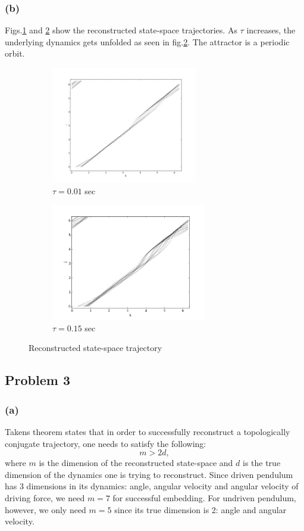 \documentclass{article}
\begin{document}
\subsubsection*{(b)}
Figs.\ref{q2b_1} and \ref{q2b_2} show the reconstructed state-space trajectories. As $\tau$ increases, the underlying dynamics gets unfolded as seen in fig.\ref{q2b_2}. The attractor is a periodic orbit.

\begin{figure}
\centering
\begin{subfigure}{.5\textwidth}
  \centering
  \includegraphics[height=2in]{figs/q2b_10.png}
  \caption{$\tau = 0.01$ sec}
  \label{q2b_1}
\end{subfigure}%
\begin{subfigure}{.5\textwidth}
  \centering
  \includegraphics[height=2in]{figs/q2b_150.png}
  \caption{$\tau = 0.15$ sec}
  \label{q2b_2}
\end{subfigure}
\caption{Reconstructed state-space trajectory}
\label{q2b}
\end{figure}

\subsection*{Problem 3}
\subsubsection*{(a)}
Takens theorem states that in order to successfully reconstruct a topologically conjugate trajectory, one needs to satisfy the following:
\[
	m > 2d,
\]
where $m$ is the dimension of the reconstructed state-space and $d$ is the true dimension of the dynamics one is trying to reconstruct. Since driven pendulum has 3 dimensions in its dynamics: angle, angular velocity and angular velocity of driving force, we need $m = 7$ for successful embedding. For undriven pendulum, however, we only need $m = 5$ since its true dimension is 2: angle and angular velocity. 
\end{document}
